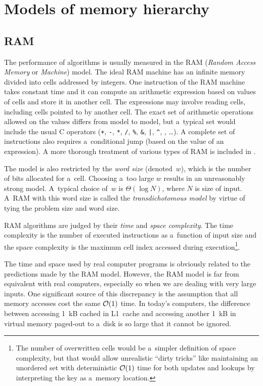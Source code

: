 \chapter{Models of memory hierarchy}
\label{chapter:models}
\section{RAM}

The performance of algorithms is usually measured in the RAM
(\emph{Random Access Memory} or \emph{Machine}) model.
The ideal RAM machine has an infinite memory divided into cells addressed
by integers.
One instruction of the RAM machine takes constant time and it
can compute an arithmetic expression based on values of cells and store it
in another cell. The expressions may involve reading cells, including cells
pointed to by another cell. The exact set of arithmetic operations allowed
on the values differs from model to model, but a~typical set would include
the usual C operators (\texttt{+}, \texttt{-}, \texttt{*}, \texttt{/},
\texttt{\%}, \texttt{\&}, \texttt{|}, \texttt{\^},
\texttt{\raisebox{0.5ex}{\texttildelow}},
\dots).  A complete set of instructions also requires a~conditional jump (based
on the value of an expression).
A more thorough treatment of various types of RAM is included
in \cite{saga-of-msts}.

The model is also restricted by the \textit{word size} (denoted~$w$),
which is the number of bits allocated for a~cell. Choosing a~too large $w$
results in an unreasonably strong model. A~typical choice of~$w$ is
$\Theta(\log N)$, where $N$ is size of input.
A~RAM with this word size is called the \textit{transdichotomous model}
by virtue of tying the problem size and word size.

RAM algorithms are judged by their \emph{time} and \emph{space complexity}.
The time complexity is the number of executed instructions as a~function of
input size and the space complexity is the maximum cell index accessed during
execution\footnote{%
	The number of overwritten cells would be a~simpler definition
	of space complexity, but that would allow unrealistic ``dirty tricks''
	like maintaining an unordered set with deterministic $\mathcal{O}(1)$ time
	for both updates and lookups by interpreting the key as a~memory
	location.
}.

The time and space used by real computer programs is obviously related
to the predictions made by the RAM model. However, the RAM model is far
from equivalent with real computers, especially so when we are dealing with
very large inputs. One significant source of this discrepancy is the assumption
that all memory accesses cost the same $\mathcal{O}(1)$ time. In today's computers,
the difference between accessing 1~kB cached in L1~cache and accessing
another 1~kB in virtual memory paged-out to a~disk is so large that it cannot
be ignored.

